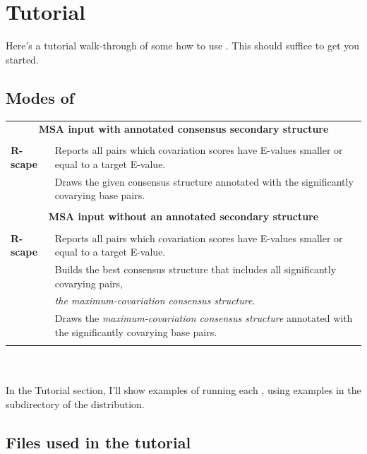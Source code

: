 
\section{Tutorial}
\label{section:tutorial}
\setcounter{footnote}{0}

Here's a tutorial walk-through of some how to use \rscape. This should
suffice to get you started.

\subsection {Modes of \rscape}

\begin{tabular}{ll}
\multicolumn{2}{c}{\textbf{MSA input with annotated consensus secondary structure}} \\ 
 & \\ 
\textbf{R-scape}   & Reports all pairs which covariation scores have E-values smaller or equal to a target E-value.\\
\textbf{}          & Draws the given consensus structure annotated with the significantly covarying base pairs.\\
 & \\ 
\multicolumn{2}{c}{\textbf{MSA input without an annotated secondary structure}}  \\
 & \\ 
\textbf{R-scape}   & Reports all pairs which covariation scores have E-values smaller or equal to a target E-value.\\
\textbf{}          & Builds the best consensus structure that includes all significantly covarying pairs,\\
\textbf{}          & \hspace{5mm}\emph{the maximum-covariation consensus structure}.\\
\textbf{}          & Draws the \emph{maximum-covariation consensus structure} annotated with the significantly covarying base pairs.\\
 & \\ 
\end{tabular} \\
\\

In the Tutorial section, I'll show examples of running each \rscape,
using examples in the  subdirectory of the
distribution.


\subsection{Files used in the tutorial}

